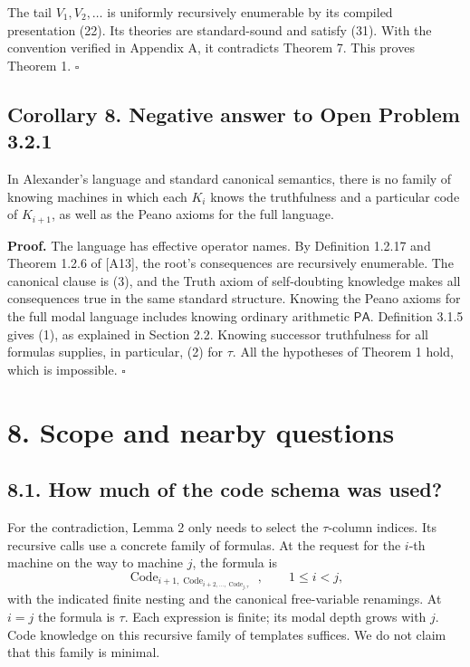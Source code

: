 \documentclass[
  11pt,
  letterpaper,
]{article}
\begin{document}
The tail \(V_1,V_2,\ldots\) is uniformly recursively enumerable by its
compiled presentation (22). Its theories are standard-sound and satisfy
(31). With the convention verified in Appendix A, it contradicts Theorem
7. This proves Theorem 1. \hfill\(\square\)

\subsection{Corollary 8. Negative answer to Open Problem
3.2.1}\label{corollary-8.-negative-answer-to-open-problem-3.2.1}

In Alexander's language and standard canonical semantics, there is no
family of knowing machines in which each \(K_i\) knows the truthfulness
and a particular code of \(K_{i+1}\), as well as the Peano axioms for
the full language.

\textbf{Proof.} The language has effective operator names. By Definition
1.2.17 and Theorem 1.2.6 of {[}A13{]}, the root's consequences are
recursively enumerable. The canonical clause is (3), and the Truth axiom
of self-doubting knowledge makes all consequences true in the same
standard structure. Knowing the Peano axioms for the full modal language
includes knowing ordinary arithmetic \(\mathsf{PA}\). Definition 3.1.5
gives (1), as explained in Section 2.2. Knowing successor truthfulness
for all formulas supplies, in particular, (2) for \(\tau\). All the
hypotheses of Theorem 1 hold, which is impossible. \hfill\(\square\)

\section{8. Scope and nearby
questions}\label{scope-and-nearby-questions}

\subsection{8.1. How much of the code schema was
used?}\label{how-much-of-the-code-schema-was-used}

For the contradiction, Lemma 2 only needs to select the \(\tau\)-column
indices. Its recursive calls use a concrete family of formulas. At the
request for the \(i\)-th machine on the way to machine \(j\), the
formula is \[
\operatorname{Code}_{i+1,
\operatorname{Code}_{i+2,\ldots,
\operatorname{Code}_{j,\tau}}},
\qquad 1\leq i<j,
\tag{32}
\] with the indicated finite nesting and the canonical free-variable
renamings. At \(i=j\) the formula is \(\tau\). Each expression is
finite; its modal depth grows with \(j\). Code knowledge on this
recursive family of templates suffices. We do not claim that this family
is minimal.
\end{document}
